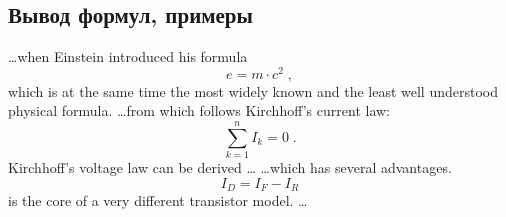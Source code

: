 \documentclass[oneside,final,14pt]{extreport}
\begin{document}
\subsection{Вывод формул, примеры}
\ldots when Einstein introduced his formula
\begin{equation}
	e = m \cdot c^2 \; ,
\end{equation}
which is at the same time the most widely known
and the least well understood physical formula.
\ldots from which follows Kirchhoff's current law:
\begin{equation}
	\sum_{k=1}^{n} I_k = 0 \; .
\end{equation}
Kirchhoff's voltage law can be derived \ldots
\ldots which has several advantages.
\begin{equation}
	I_D = I_F - I_R
\end{equation}
is the core of a very different transistor model. \ldots
\end{document}
